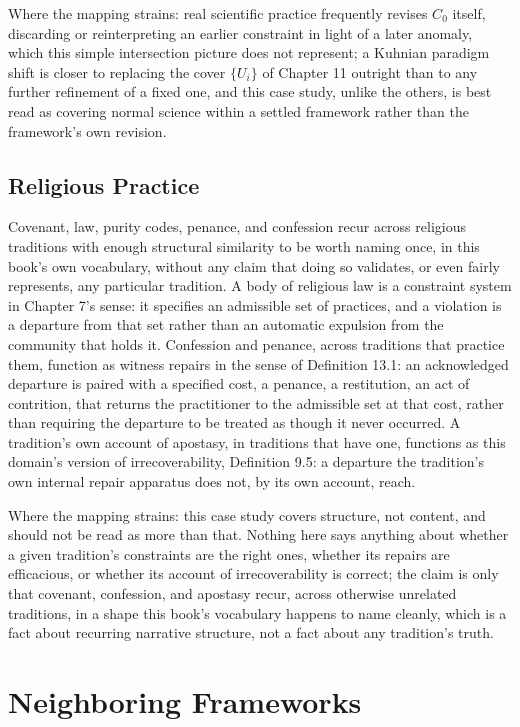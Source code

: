 \documentclass[11pt]{book}
\begin{document}
Where the mapping strains: real scientific practice frequently revises $C_0$ itself, discarding or reinterpreting an earlier constraint in light of a later anomaly, which this simple intersection picture does not represent; a Kuhnian paradigm shift is closer to replacing the cover $\{U_i\}$ of Chapter 11 outright than to any further refinement of a fixed one, and this case study, unlike the others, is best read as covering normal science within a settled framework rather than the framework's own revision.

\section*{Religious Practice}

Covenant, law, purity codes, penance, and confession recur across religious traditions with enough structural similarity to be worth naming once, in this book's own vocabulary, without any claim that doing so validates, or even fairly represents, any particular tradition. A body of religious law is a constraint system in Chapter 7's sense: it specifies an admissible set of practices, and a violation is a departure from that set rather than an automatic expulsion from the community that holds it. Confession and penance, across traditions that practice them, function as witness repairs in the sense of Definition 13.1: an acknowledged departure is paired with a specified cost, a penance, a restitution, an act of contrition, that returns the practitioner to the admissible set at that cost, rather than requiring the departure to be treated as though it never occurred. A tradition's own account of apostasy, in traditions that have one, functions as this domain's version of irrecoverability, Definition 9.5: a departure the tradition's own internal repair apparatus does not, by its own account, reach.

Where the mapping strains: this case study covers structure, not content, and should not be read as more than that. Nothing here says anything about whether a given tradition's constraints are the right ones, whether its repairs are efficacious, or whether its account of irrecoverability is correct; the claim is only that covenant, confession, and apostasy recur, across otherwise unrelated traditions, in a shape this book's vocabulary happens to name cleanly, which is a fact about recurring narrative structure, not a fact about any tradition's truth.

\chapter*{Neighboring Frameworks}
\end{document}
